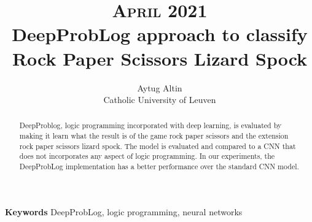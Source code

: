 \documentclass[10pt,letterpaper]{article}
\title{
		\usefont{OT1}{bch}{b}{n}
		\normalfont \normalsize \textsc{April 2021 } \\ [10pt]
		\huge  DeepProbLog approach to classify Rock Paper Scissors Lizard Spock\\
}
\author[0]{Aytug Altin \\
		Catholic University of Leuven\\
        }
\begin{document}
\maketitle
{}

\begin{abstract}
	DeepProblog, logic programming incorporated with deep learning, is evaluated by making it learn what the result is of the game rock paper scissors and the extension rock paper scissors lizard spock. The model is evaluated and compared to a CNN that does not incorporates any aspect of logic programming. In our experiments, the DeepProbLog implementation has a better performance over the standard CNN model.
\end{abstract}


{\textbf{Keywords}
DeepProbLog, logic programming, neural networks}











{}
\end{document}
